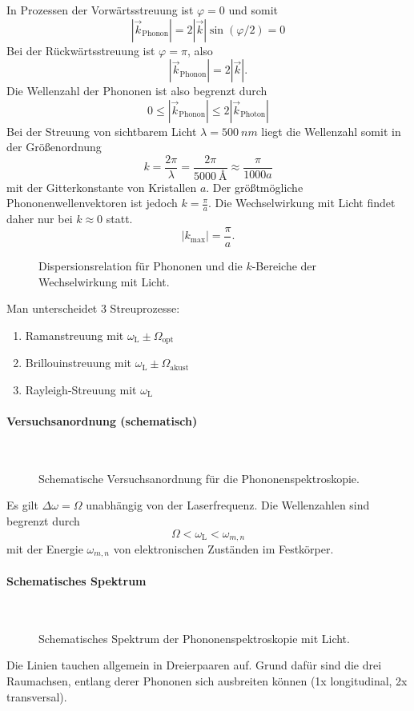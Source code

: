 	In Prozessen der Vorwärtsstreuung ist $\varphi=0$ und somit
	$$
		|\Vec{k}_{\text{Phonon}}| = 2 |\Vec{k}| \sin\left( \varphi /2 \right) =0
	$$
	Bei der Rückwärtsstreuung ist $\varphi=\pi$, also
	$$|\Vec{k}_{\text{Phonon}}| = 2 |\Vec{k}|.$$
	Die Wellenzahl der Phononen ist also begrenzt durch
	$$
		0 \le | \Vec{k}_{\text{Phonon}}| \le 2 |\Vec{k}_{\text{Photon}}|
	$$ 
	Bei der Streuung von sichtbarem Licht $\lambda = \SI{500}{nm}$ liegt die Wellenzahl somit in der Größenordnung
	$$
		k = \frac{2\pi}{\lambda} = \frac{2\pi}{\SI{5000}{\angstrom}} \approx \frac{\pi}{1000a}
	$$
	mit der Gitterkonstante von Kristallen $a$. Der größtmögliche Phononenwellenvektoren ist jedoch $k=\frac\pi a$. Die Wechselwirkung mit Licht findet daher nur bei $k\approx0$ statt.
	$$
		|k_\mathrm{max}|=\frac\pi a.
	$$
	\begin{figure}[H]
		\centering
		\caption{Dispersionsrelation für Phononen und die $k$-Bereiche der Wechselwirkung mit Licht.}
		\label{fig:vl22_abbildung_2}
	\end{figure}

	Man unterscheidet 3 Streuprozesse:
	\begin{enumerate}
		\item Ramanstreuung mit $\omega_{\text{L}} \pm \Omega_{\text{opt}}$ 
		\item Brillouinstreuung mit $\omega_{\text{L}} \pm \Omega_{\text{akust}}$ 
		\item Rayleigh-Streuung mit $\omega_{\text{L}}$
	\end{enumerate}

\paragraph{Versuchsanordnung (schematisch)}\,\\
	\begin{figure}[H]
		\centering
		\caption{Schematische Versuchsanordnung für die Phononenspektroskopie.}
		\label{fig:vl22_abbildung_3}
	\end{figure}
	Es gilt $\Delta \omega = \Omega$ unabhängig von der Laserfrequenz. Die Wellenzahlen sind begrenzt durch
	$$
	\Omega < \omega_{\text{L}} < \omega_{m,n}
	$$ 
	mit der Energie $\omega_{m,n}$ von elektronischen Zuständen im Festkörper.

\paragraph{Schematisches Spektrum}\,\\ 
	\begin{figure}[H]
		\centering
		\caption{Schematisches Spektrum der Phononenspektroskopie mit Licht.}
		\label{fig:vl22_abbildung_4}
	\end{figure}
	\begin{verbal}
		Die Linien tauchen allgemein in Dreierpaaren auf.
		Grund dafür sind die drei Raumachsen, entlang derer Phononen sich ausbreiten können (1x longitudinal, 2x transversal).
	\end{verbal}

